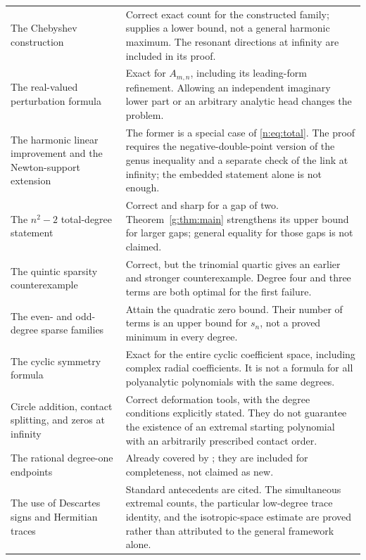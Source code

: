 \documentclass[UTF8,11pt]{ctexart}
\theoremstyle{definition}
\numberwithin{equation}{section}
\begin{document}
\begin{longtable}{@{}>{\raggedright\arraybackslash}p{}>{\raggedright\arraybackslash}p{}@{}}
The Chebyshev construction & Correct exact count for the constructed family; supplies a lower bound, not a general harmonic maximum. The resonant directions at infinity are included in its proof. \\
The real-valued perturbation formula & Exact for $A_{m,n}$, including its leading-form refinement. Allowing an independent imaginary lower part or an arbitrary analytic head changes the problem. \\
The harmonic linear improvement and the Newton-support extension & The former is a special case of \eqref{n:eq:total}. The proof requires the negative-double-point version of the genus inequality and a separate check of the link at infinity; the embedded statement alone is not enough. \\
The $n^2-2$ total-degree statement & Correct and sharp for a gap of two. Theorem~\ref{g:thm:main} strengthens its upper bound for larger gaps; general equality for those gaps is not claimed. \\
The quintic sparsity counterexample & Correct, but the trinomial quartic gives an earlier and stronger counterexample. Degree four and three terms are both optimal for the first failure. \\
The even- and odd-degree sparse families & Attain the quadratic zero bound. Their number of terms is an upper bound for $s_n$, not a proved minimum in every degree. \\
The cyclic symmetry formula & Exact for the entire cyclic coefficient space, including complex radial coefficients. It is not a formula for all polyanalytic polynomials with the same degrees. \\
Circle addition, contact splitting, and zeros at infinity & Correct deformation tools, with the degree conditions explicitly stated. They do not guarantee the existence of an extremal starting polynomial with an arbitrarily prescribed contact order. \\
The rational degree-one endpoints & Already covered by \cite{KN06,LSL15,LZ18,LM14}; they are included for completeness, not claimed as new. \\
The use of Descartes signs and Hermitian traces & Standard antecedents are cited. The simultaneous extremal counts, the particular low-degree trace identity, and the isotropic-space estimate are proved rather than attributed to the general framework alone. \\
\bottomrule
\end{longtable}
\normalsize
\end{document}
